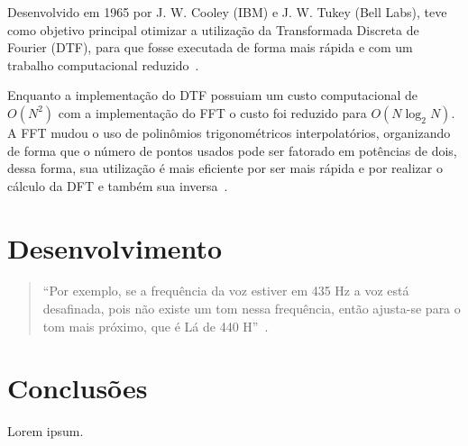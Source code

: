 \documentclass{sbrt}
\begin{document}
Desenvolvido em 1965 por  J. W. Cooley (IBM) e J. W. Tukey (Bell Labs), teve como objetivo principal otimizar a
utilização da Transformada Discreta de Fourier (DTF), para que fosse executada de forma mais rápida e com um trabalho
computacional reduzido~\cite{martins2016analise}.

Enquanto a implementação do DTF possuiam um custo computacional de $O(N^2)$ com a implementação do FFT o custo foi
reduzido para $O(N \log_2{N})$. A FFT mudou o uso de polinômios trigonométricos interpolatórios, organizando de forma
que o número de pontos usados pode ser fatorado em potências de dois, dessa forma, sua utilização é mais eficiente por
ser mais rápida e por realizar o cálculo da DFT e também sua inversa~\cite{reis2008implementaccao}.


\section{Desenvolvimento}

\begin{quote}
  ``Por exemplo, se a frequência da voz estiver em 435 Hz a voz está desafinada, pois não existe um tom nessa
  frequência, então ajusta-se para o tom mais próximo, que é Lá de 440 H''~\cite{deimplementaccao}.
\end{quote}


\section{Conclusões}

Lorem ipsum.





\end{document}
